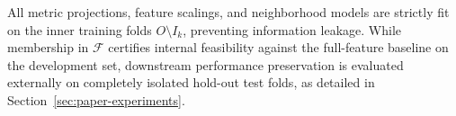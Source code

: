 \begin{remark}
	All metric projections, feature scalings, and neighborhood models are strictly fit on the inner training folds $O \setminus I_k$, preventing information leakage. While membership in $\mathcal{F}$ certifies internal feasibility against the full-feature baseline on the development set, downstream performance preservation is evaluated externally on completely isolated hold-out test folds, as detailed in Section~\ref{sec:paper-experiments}.
\end{remark}


\FloatBarrier

